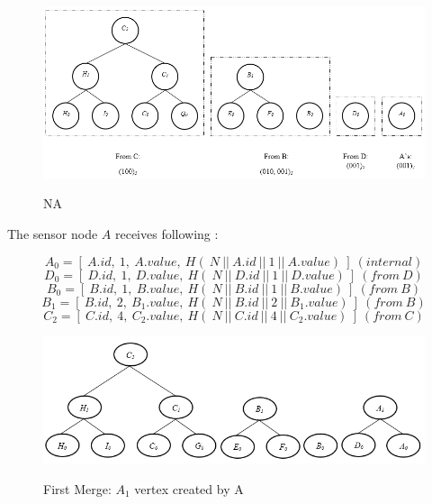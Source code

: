	\newpage
	\begin{figure}[hp]
		\centering
		\includegraphics[scale = 0.7]{images/commitment-tree-example-1.png}\\
		\caption{NA}
	\end{figure}

	The sensor node $A$ receives following \payloads:

	\begin{equation}
		A_{0} = [\ A.id,\ 1,\ A.value,\ H  (\ N\ ||\ A.id\ ||\ 1\ ||\ A.value)\ ]\ (internal)
	\end{equation}
	\begin{equation}
		D_{0} = [\ D.id,\ 1,\ D.value,\ H(\ N\ ||\ D.id\ ||\ 1\ ||\ D.value)\ ]\ (from\ D)
	\end{equation}
	\begin{equation}
		B_{0} = [\ B.id,\ 1,\ B.value,\ H(\ N\ ||\ B.id\ ||\ 1\ ||\ B.value)\ ]\ (from\ B)
	\end{equation}
	\begin{equation}
		B_{1} = [\ B.id,\ 2,\ B_{1}.value,\ H(\ N\ ||\ B.id\ ||\ 2\ ||\ B_{1}.value)\ ]\ (from\ B)
	\end{equation}
	\begin{equation}
		C_{2} = [\ C.id,\ 4,\ C_{2}.value,\ H(\ N\ ||\ C.id\ ||\ 4\ ||\ C_{2}.value)\ ]\ (from\ C)
	\end{equation}
	
	\begin{figure}[hp]
		\centering
		\includegraphics[scale = 0.7]{images/commitment-tree-example-2.png}\\
		\caption{First Merge: $A_{1}$ vertex created by A}
	\end{figure}


